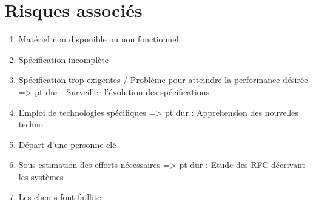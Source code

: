 \documentclass{report}
\begin{document}
\section*{Risques associés}
\begin{enumerate}
\item Matériel non disponible ou non fonctionnel
\item Spécification incomplète
\item Spécification trop exigentes / Problème pour atteindre la performance désirée => pt dur : Surveiller l'évolution des spécifications
\item Emploi de technologies spécifiques => pt dur : Apprehension des nouvelles techno
\item Départ d'une personne clé
\item Sous-estimation des efforts nécessaires => pt dur : Etude des RFC décrivant les systèmes
\item Les clients font faillite
\end{enumerate}

\end{document}
